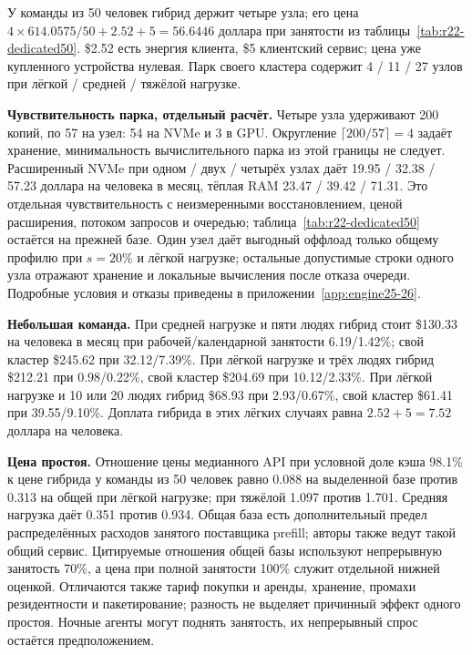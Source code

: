 У команды из 50 человек гибрид держит четыре узла; его цена
$4\times614.0575/50+2.52+5=56.6446$ доллара при занятости из таблицы~\ref{tab:r22-dedicated50}.
\$2.52 есть энергия клиента, \$5 клиентский сервис; цена уже купленного устройства нулевая.
Парк своего кластера содержит 4 / 11 / 27 узлов при лёгкой / средней / тяжёлой нагрузке.

\textbf{Чувствительность парка, отдельный расчёт.} Четыре узла удерживают 200 копий,
по 57 на узел: 54 на NVMe и 3 в GPU. Округление $\lceil200/57\rceil=4$ задаёт хранение,
минимальность вычислительного парка из этой границы не следует.
Расширенный NVMe при одном / двух / четырёх узлах даёт 19.95 / 32.38 / 57.23 доллара на человека в месяц,
тёплая RAM 23.47 / 39.42 / 71.31. Это отдельная чувствительность с неизмеренными восстановлением,
ценой расширения, потоком запросов и очередью; таблица~\ref{tab:r22-dedicated50} остаётся на прежней базе.
Один узел даёт выгодный оффлоад только общему профилю при $s=20\%$ и лёгкой нагрузке;
остальные допустимые строки одного узла отражают хранение и локальные вычисления после отказа очереди.
Подробные условия и отказы приведены в приложении~\ref{app:engine25-26}.

\textbf{Небольшая команда.} При средней нагрузке и пяти людях гибрид стоит \$130.33 на человека в месяц
при рабочей/календарной занятости 6.19/1.42\%; свой кластер \$245.62 при 32.12/7.39\%.
При лёгкой нагрузке и трёх людях гибрид \$212.21 при 0.98/0.22\%, свой кластер \$204.69 при 10.12/2.33\%.
При лёгкой нагрузке и 10 или 20 людях гибрид \$68.93 при 2.93/0.67\%, свой кластер \$61.41 при 39.55/9.10\%.
Доплата гибрида в этих лёгких случаях равна $2.52+5=7.52$ доллара на человека.

\textbf{Цена простоя.} Отношение цены медианного API при условной доле кэша 98.1\% к цене гибрида
у команды из 50 человек равно 0.088 на выделенной базе против 0.313 на общей при лёгкой нагрузке;
при тяжёлой 1.097 против 1.701. Средняя нагрузка даёт 0.351 против 0.934.
Общая база есть дополнительный предел распределённых расходов занятого поставщика prefill;
авторы также ведут такой общий сервис. Цитируемые отношения общей базы используют непрерывную занятость 70\%,
а цена при полной занятости 100\% служит отдельной нижней оценкой.
Отличаются также тариф покупки и аренды, хранение, промахи резидентности и пакетирование;
разность не выделяет причинный эффект одного простоя. Ночные агенты могут поднять занятость,
их непрерывный спрос остаётся предположением.

